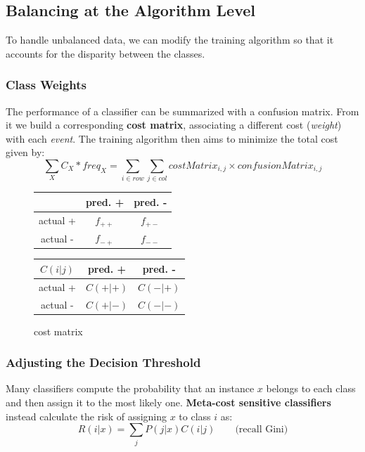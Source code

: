 \subsection{Balancing at the Algorithm Level}
To handle unbalanced data, we can modify the training algorithm so that it accounts for the disparity between the classes.

\subsubsection{Class Weights}
The performance of a classifier can be summarized with a confusion matrix. From it we build a corresponding \textbf{cost matrix}, associating a different cost (\textit{weight}) with each \textit{event}. The training algorithm then aims to minimize the total cost given by:
\begin{equation}
    \sum_X C_X * \textit{freq}_X = \sum_{i\in row}\sum_{j\in col} costMatrix_{i,j} \times confusionMatrix_{i,j}
\end{equation}

\begin{figure}[H]
\centering
\begin{minipage}{0.49\textwidth}
\centering
    \begin{tabular}{|c||c|c|}
         \hline
         & pred. + & pred. - \\
        \hline
        \hline
        actual + & $f_{++}$ & $f_{+-}$\\
        \hline
        actual - & $f_{-+}$ & $f_{--}$\\
        \hline
    \end{tabular}
    \caption{confusion matrix}
\end{minipage}
\hfill
\begin{minipage}{0.49\textwidth}
\centering
    \begin{tabular}{|c||c|c|}
         \hline
        $C(i|j)$ & pred. + & pred. - \\
        \hline
        \hline
        actual + & $C(+|+)$ & $C(-|+)$\\
        \hline
        actual - & $C(+|-)$ & $C(-|-)$\\
        \hline
    \end{tabular}
    \caption{cost matrix}
\end{minipage}
\end{figure}

\subsubsection{Adjusting the Decision Threshold}
Many classifiers compute the probability that an instance $x$ belongs to each class and then assign it to the most likely one. \textbf{Meta-cost sensitive classifiers} instead calculate the risk of assigning $x$ to class $i$ as:
\begin{equation}
    R(i|x) = \sum_j P(j|x)C(i|j) \qquad \text{(recall Gini)}
\end{equation}

